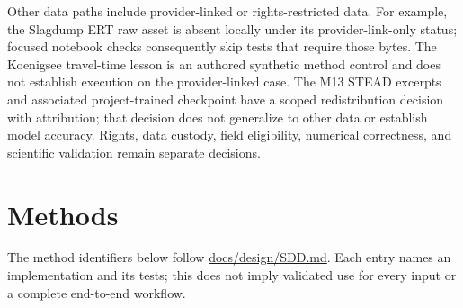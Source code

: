 Other data paths include provider-linked or rights-restricted data. For
example, the Slagdump ERT raw asset is absent locally under its
provider-link-only status; focused notebook checks consequently skip
tests that require those bytes. The Koenigsee travel-time lesson is an
authored synthetic method control and does not establish execution on
the provider-linked case. The M13 STEAD excerpts \cite{mousavi2019} and
associated project-trained checkpoint have a scoped redistribution
decision with attribution; that decision does not generalize to other
data or establish model accuracy. Rights, data custody, field
eligibility, numerical correctness, and scientific validation remain
separate decisions.

\section{Methods}\label{methods}

The method identifiers below follow \url{docs/design/SDD.md}. Each entry
names an implementation and its tests; this does not imply validated use
for every input or a complete end-to-end workflow.

